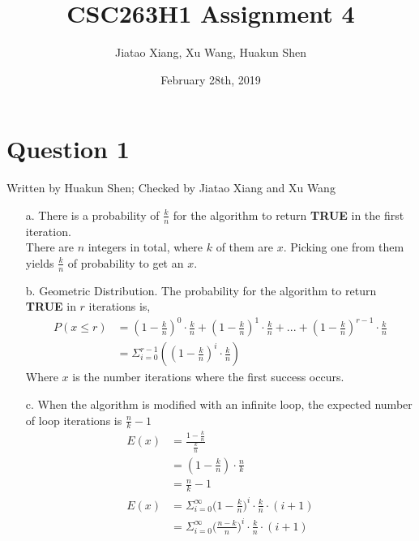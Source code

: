 \documentclass[10pt]{article}
\title{CSC263H1 Assignment 4}
\author{Jiatao Xiang, Xu Wang, Huakun Shen}
\date{February 28th, 2019}
\begin{document}
\lstset{style=mystyle}
\maketitle
\section*{Question 1} Written by Huakun Shen; Checked by Jiatao Xiang and Xu Wang\\
\begin{enumerate}
\item[a.] There is a probability of $\frac{k}{n}$ for the algorithm to return \textbf{TRUE} in the first iteration.\\
There are $n$ integers in total, where $k$ of them are $x$. Picking one from them yields $\frac{k}{n}$ of probability to get an $x$.

\item[b.] Geometric Distribution. The probability for the algorithm to return \textbf{TRUE} in $r$ iterations is,
\begin{align*}
P(x\leq r)&=(1-\frac{k}{n})^0\cdot \frac{k}{n}+(1-\frac{k}{n})^1\cdot \frac{k}{n}+...+(1-\frac{k}{n})^{r-1}\cdot \frac{k}{n}\\
&=\Sigma^{r-1}_{i=0}((1-\frac{k}{n})^i\cdot \frac{k}{n})
\end{align*}
Where $x$ is the number iterations where the first success occurs.
\item[c.] When the algorithm is modified with an infinite loop, the expected number of loop iterations is $\frac{n}{k}-1$
\begin{align*}
E(x)&=\frac{1-\frac{k}{n}}{\frac{k}{n}}\\
&=(1-\frac{k}{n})\cdot\frac{n}{k}\\
&=\frac{n}{k}-1\\
E(x)&=\Sigma^\infty_{i=0}\Big(1-\frac{k}{n}\Big)^i\cdot\frac{k}{n}\cdot(i+1)\\
&=\Sigma^\infty_{i=0}\Big(\frac{n-k}{n}\Big)^i\cdot\frac{k}{n}\cdot(i+1)
\end{align*}
\end{enumerate}
\end{document}
